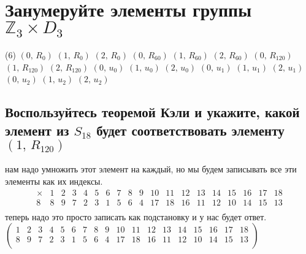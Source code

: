 \documentclass{article}
\newcommand{\Z}{\mathbb{Z}}
\begin{document}
  \section{Занумеруйте элементы группы $\Z_3 \times D_3$}
  \begin{tasks}[style=enumerate](6)
    \task $ \left(0,\, R_0\right) $
    \task $ \left(1,\, R_0\right) $
    \task $ \left(2,\, R_0\right) $
    \task $ \left(0,\, R_{60}\right) $
    \task $ \left(1,\, R_{60}\right) $
    \task $ \left(2,\, R_{60}\right) $
    \task $ \left(0,\, R_{120}\right) $
    \task $ \left(1,\, R_{120}\right) $
    \task $ \left(2,\, R_{120}\right) $
    \task $ \left(0,\, u_0\right) $
    \task $ \left(1,\, u_0\right) $
    \task $ \left(2,\, u_0\right) $
    \task $ \left(0,\, u_1\right) $
    \task $ \left(1,\, u_1\right) $
    \task $ \left(2,\, u_1\right) $
    \task $ \left(0,\, u_2\right) $
    \task $ \left(1,\, u_2\right) $
    \task $ \left(2,\, u_2\right) $
  \end{tasks}

  \subsection{Воспользуйтесь теоремой Кэли и укажите, какой элемент из $S_{18}$ будет соответствовать элементу $(1,\, R_{120})$}
  нам надо умножить этот элемент на каждый, но мы будем записывать все эти элементы как их индексы.
  \[
    \begin{array}{c|cccccccccccccccccc}
      \times & 1 & 2 & 3 & 4 & 5 & 6 & 7 & 8 & 9 & 10 & 11 & 12 & 13 & 14 & 15 & 16 & 17 & 18 \\
      \hline
      8      & 8 & 9 & 7 & 2 & 3 & 1 & 5 & 6 & 4 & 17 & 18 & 16 & 11 & 12 & 10 & 14 & 15 & 13 \\
    \end{array}
  \]
  теперь надо это просто записать как подстановку и у нас будет ответ. \\
  $\begin{pmatrix}
    1 & 2 & 3 & 4 & 5 & 6 & 7 & 8 & 9 & 10 & 11 & 12 & 13 & 14 & 15 & 16 & 17 & 18 \\
    8 & 9 & 7 & 2 & 3 & 1 & 5 & 6 & 4 & 17 & 18 & 16 & 11 & 12 & 10 & 14 & 15 & 13 \\
  \end{pmatrix}$

  \newpage
  \setcounter{section}{9}
\end{document}
